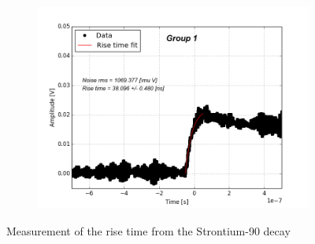 \documentclass[12pt]{article}
\begin{document}
\begin{figure}[t!]
\begin{subfigure}[t]{0.45\textwidth}
  \end{subfigure}
  \hfill
  \begin{subfigure}[t]{0.45\textwidth}
    \centering
    \includegraphics[width=1.2\textwidth]{./graphics/data_5.png}
  \end{subfigure}
\caption{Measurement of the rise time from the Strontium-90 decay}
\label{fig:rise_time_measurement}
\end{figure}
\end{document}
